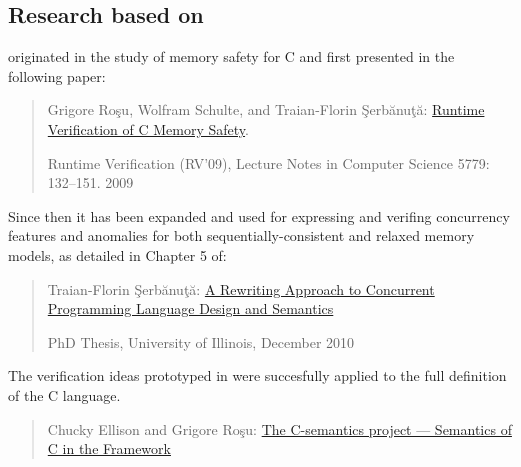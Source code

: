 \begin{latexComment}
\subsection{Research based on \KERNELC}
\KERNELC originated in the study of memory safety for C and first presented in the following paper:
\begin{quote}
Grigore Ro\c su, Wolfram Schulte, and Traian-Florin \c Serb\u anu\c t\u a:
\href{http://dx.doi.org/10.1007/978-3-642-04694-0_10}{Runtime Verification of C Memory Safety}.

Runtime Verification (RV'09), Lecture Notes in Computer Science 5779: 132--151. 2009
\end{quote}

Since then it has been expanded and used for expressing and verifing concurrency features and anomalies for both sequentially-consistent and relaxed memory models, as detailed in Chapter 5 of:

\begin{quote}
  Traian-Florin \c Serb\u anu\c t\u a: \href{https://www.ideals.illinois.edu/handle/2142/18252}{A Rewriting Approach to Concurrent Programming Language Design and Semantics}

  PhD Thesis, University of Illinois, December 2010
\end{quote}


The verification ideas prototyped in \KERNELC were succesfully applied to the full \K definition of the C language.
\begin{quote}
  Chucky Ellison and Grigore Ro\c su: \href{http://c-semantics.googlecode.com}{The C-semantics project --- Semantics of C in the \K Framework}
\end{quote}

\end{latexComment}

\vspace*{3ex}

